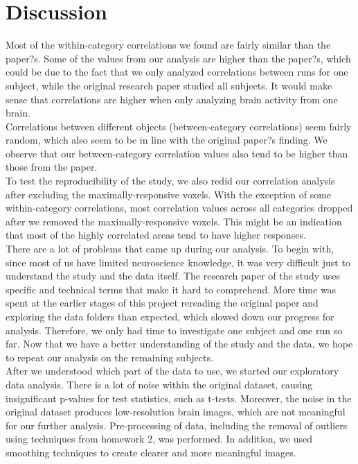 \documentclass[11pt,twocolumn]{article}
\begin{document}
\section{Discussion}

Most of the within-category correlations we found are fairly similar than the paper?s. 
Some of the values from our analysis are higher than the paper?s, which could be 
due to the fact that we only analyzed correlations between runs for one subject, 
while the original research paper studied all subjects. It would make sense that 
correlations are higher when only analyzing brain activity from one brain. \\

Correlations between different objects (between-category correlations) seem 
fairly random, which also seem to be in line with the original paper?s finding. 
We observe that our between-category correlation values also tend to be higher 
than those from the paper. \\

To test the reproducibility of the study, we also redid our correlation analysis 
after excluding the maximally-responsive voxels. With the exception of some 
within-category correlations, most correlation values across all categories dropped 
after we removed the maximally-responsive voxels. This might be an indication 
that most of the highly correlated areas tend to have higher responses. \\

There are a lot of problems that came up during our analysis. To begin with, 
since most of us have limited neuroscience knowledge, it was very difficult 
just to understand the study and the data itself. The research paper of the 
study uses specific and technical terms that make it hard to comprehend. 
More time was spent at the earlier stages of this project rereading the 
original paper and exploring the data folders than expected, which slowed down 
our progress for analysis. Therefore, we only had time to investigate one 
subject and one run so far. Now that we have a better understanding of the 
study and the data, we hope to repeat our analysis on the remaining subjects.\\

After we understood which part of the data to use, we started our 
exploratory data analysis. There is a lot of noise within the original dataset, 
causing insignificant p-values for test statistics, such as t-tests. Moreover, 
the noise in the original dataset produces low-resolution brain images, 
which are not meaningful for our further analysis. Pre-processing of data, 
including the removal of outliers using techniques from homework 2, was 
performed. In addition, we used smoothing techniques to create clearer 
and more meaningful images. \\
\end{document}
